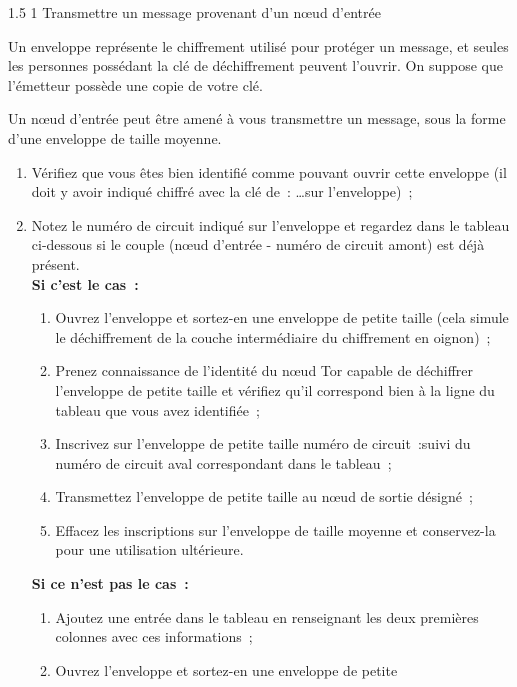 \documentclass[a4paper,twoside,french]{article}
\makeatletter
\renewcommand\section{\@startsection
  {section}{1}{1cm}%
  {1.5\baselineskip}%
  {1\baselineskip}%
  {\normalfont\Large\bfseries}}%
\makeatother
\begin{document}
  \section{Transmettre un message provenant d'un n\oe ud d'entrée}

  Un enveloppe représente le chiffrement utilisé pour protéger un
  message, et seules les personnes possédant la clé de déchiffrement
  peuvent l'ouvrir. On suppose que l'émetteur possède une copie de
  votre clé.

  Un n\oe ud d'entrée peut être amené à vous transmettre un message,
  sous la forme d'une enveloppe de taille moyenne.

  \begin{enumerate}
  \item Vérifiez que vous êtes bien identifié comme pouvant ouvrir
    cette enveloppe (il doit y avoir indiqué \og chiffré avec la clé
    de~: \ldots\fg sur l'enveloppe)~;
  \item Notez le numéro de circuit indiqué sur l'enveloppe et regardez
    dans le tableau ci-dessous si le couple (n\oe ud d'entrée - numéro
    de circuit amont) est déjà présent.\\
    \textbf{Si c'est le cas~:}
    \begin{enumerate}
    \item Ouvrez l'enveloppe et sortez-en une enveloppe de petite
      taille (cela simule le déchiffrement de la couche intermédiaire
      du chiffrement en oignon)~;
    \item Prenez connaissance de l'identité du n\oe ud Tor capable de
      déchiffrer l'enveloppe de petite taille et vérifiez qu'il
      correspond bien à la ligne du tableau que vous avez identifiée~;
    \item Inscrivez sur l'enveloppe de petite taille \og numéro de
      circuit~:\fg suivi du numéro de circuit aval correspondant dans
      le tableau~;
    \item Transmettez l'enveloppe de petite taille au n\oe ud de
      sortie désigné~;
    \item Effacez les inscriptions sur l'enveloppe de taille moyenne
      et conservez-la pour une utilisation ultérieure.
    \end{enumerate}
    \textbf{Si ce n'est pas le cas~:}
    \begin{enumerate}
    \item Ajoutez une entrée dans le tableau en renseignant les deux
      premières colonnes avec ces informations~;
    \item Ouvrez l'enveloppe et sortez-en une enveloppe de petite

\end{enumerate}
\end{enumerate}
\end{document}
